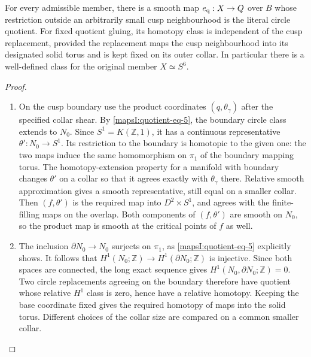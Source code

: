 \begin{theorem}\hypertarget{tag-02PD}{}\label{mapsI:src:A.2.1}

For every admissible member, there is a smooth map
$e_{\rm q}:X\to Q$ over $B$ whose restriction outside an arbitrarily
small cusp neighbourhood is the literal circle quotient.
For fixed quotient gluing, its homotopy class is independent
of the cusp replacement, provided the replacement maps the
cusp neighbourhood into its designated solid torus and is
kept fixed on its outer collar.  In particular there is a
well-defined class for the original member $X\simeq S^6$.
\end{theorem}



\begin{proof}
\begin{enumerate}[label=\arabic*.,leftmargin=*]
\item On the cusp boundary use the product coordinates
$(q,\theta_\gamma)$ after the specified collar shear.
By \eqref{mapsI:quotient-eq-5}, the boundary circle class extends to $N_0$.
Since $S^1=K(\mathbb Z,1)$, it has a continuous representative
$\theta':N_0\to S^1$.  Its restriction to the boundary is
homotopic to the given one: the two maps induce the same
homomorphism on $\pi_1$ of the boundary mapping torus.
The homotopy-extension property for a manifold with boundary
changes $\theta'$ on a collar so that it agrees exactly with
$\theta_\gamma$ there.  Relative smooth approximation gives
a smooth representative, still equal on a smaller collar.
Then $(f,\theta')$ is the required map into $D^2\times S^1$,
and agrees with the finite-filling maps on the overlap.
Both components of $(f,\theta')$ are smooth on $N_0$, so the
product map is smooth at the critical points of $f$ as well.

\item The inclusion $\partial N_0\to N_0$ surjects on $\pi_1$,
as \eqref{mapsI:quotient-eq-5} explicitly shows.  It follows that
$H^1(N_0;\mathbb Z)\to H^1(\partial N_0;\mathbb Z)$
is injective.  Since both spaces are connected, the long
exact sequence gives $H^1(N_0,\partial N_0;\mathbb Z)=0$.
Two circle replacements agreeing on the boundary therefore
have quotient whose relative $H^1$ class is zero, hence
have a relative homotopy.  Keeping the base coordinate
fixed gives the required homotopy of maps into the solid
torus.  Different choices of the collar size are compared
on a common smaller collar.
\end{enumerate}
\end{proof}